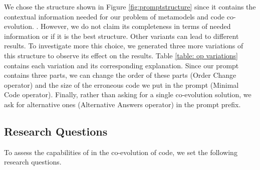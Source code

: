 We chose the structure shown in Figure \ref{fig:promptstructure} since it contains the contextual information needed for our problem of metamodels and code co-evolution. . However, we do not claim its completeness in terms of needed information or if it is the best structure. Other variants can lead to different results. 
To investigate more this choice, we generated three more variations of this structure to observe its effect on the results. Table \ref{table: op variations} contains each variation and its corresponding explanation. Since our prompt contains three parts, we can change the order of these parts (Order Change operator) and the size of the erroneous code we put in the prompt (Minimal Code operator). Finally, rather than asking for a single co-evolution solution, we ask for alternative ones (Alternative Answers operator) in the prompt prefix. 


\subsection{Research Questions}

To assess the capabilities of \LLM in the co-evolution of code, we set the following research questions. 

